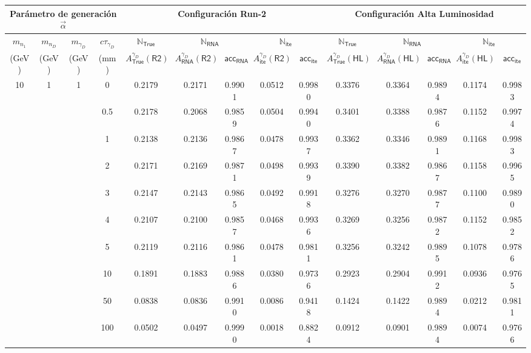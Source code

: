 \begin{landscape}
\begin{table}[!t]
\centering
\footnotesize
\begin{tabular}{|cccc|c|cc|cc|c|cc|cc|}
\toprule
\multicolumn{4}{|c|}{Parámetro de generación $\vec{\alpha}$} & 
\multicolumn{5}{c}{Configuración Run-2%
} & \multicolumn{5}{c|}{Configuración Alta Luminosidad%
}\\
\hline
$m_{n_1}$ & $m_{n_D}$ & $m_{\gamma_D}$ & $c\tau_{\gamma_D}$ &
$\mathbb{N}_\textsf{True}$ &
\multicolumn{2}{c}{$\mathbb{N}_\textsf{RNA}$} & 
\multicolumn{2}{|c|}{$\mathbb{N}_\textsf{ite}$} & 
$\mathbb{N}_\textsf{True}$ &
\multicolumn{2}{c}{$\mathbb{N}_\textsf{RNA}$} & 
\multicolumn{2}{|c|}{$\mathbb{N}_\textsf{ite}$}\\
(GeV) & (GeV) & (GeV) & (mm) & 
$A_\textsf{True}^{\gamma_D} (\textsf{R2})$ & $A_\textsf{RNA}^{\gamma_D} (\textsf{R2})$ & $\textsf{acc}_\textsf{RNA}$ & $A_\textsf{ite}^{\gamma_D} (\textsf{R2})$ & $\textsf{acc}_\textsf{ite}$ & 
$A_\textsf{True}^{\gamma_D} (\textsf{HL})$ & $A_\textsf{RNA}^{\gamma_D} (\textsf{HL})$ & $\textsf{acc}_\textsf{RNA}$ & $A_\textsf{ite}^{\gamma_D} (\textsf{HL})$ & $\textsf{acc}_\textsf{ite}$\\
\midrule
10 	& 1 & 1 & 0 	& 0.2179& 0.2171& 0.9901& 0.0512& 0.9980& 0.3376& 0.3364& 0.9894& 0.1174& 0.9983\\
  	&   &   & 0.5 	& 0.2178& 0.2068& 0.9859& 0.0504& 0.9940& 0.3401& 0.3388& 0.9876& 0.1152& 0.9974\\
	& 	& 	& 1		& 0.2138& 0.2136& 0.9867& 0.0478& 0.9937& 0.3362& 0.3346& 0.9891& 0.1168& 0.9983\\
	& 	& 	& 2		& 0.2171& 0.2169& 0.9871& 0.0498& 0.9939& 0.3390& 0.3382& 0.9867& 0.1158& 0.9965\\
	&	&	& 3 	& 0.2147& 0.2143& 0.9865& 0.0492& 0.9918& 0.3276& 0.3270& 0.9877& 0.1100& 0.9890\\
	& 	& 	& 4		& 0.2107& 0.2100& 0.9857& 0.0468& 0.9936& 0.3269& 0.3256& 0.9872& 0.1152& 0.9852\\
	& 	& 	& 5		& 0.2119& 0.2116& 0.9861& 0.0478& 0.9811& 0.3256& 0.3242& 0.9895& 0.1078& 0.9786\\
	&	&	& 10	& 0.1891& 0.1883& 0.9886& 0.0380& 0.9736& 0.2923& 0.2904& 0.9912& 0.0936& 0.9765\\
	&	&	& 50 	& 0.0838& 0.0836& 0.9910& 0.0086& 0.9418& 0.1424& 0.1422& 0.9894& 0.0212& 0.9811\\
	&	&	& 100 	& 0.0502& 0.0497& 0.9990& 0.0018& 0.8824& 0.0912& 0.0901& 0.9894& 0.0074& 0.9766\\

\end{tabular}
\end{table}
\end{landscape}
